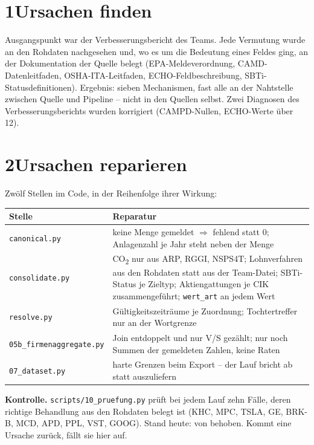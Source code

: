 \documentclass[11pt,a4paper]{article}
\newcommand{\infobox}[1]{\par\noindent\colorbox{softgrey}{\begin{minipage}{\dimexpr\linewidth-2\fboxsep}\small\vspace{3pt}#1\vspace{3pt}\end{minipage}}\par}
\begin{document}
\section*{1\quad Ursachen finden}
Ausgangspunkt war der Verbesserungsbericht des Teams. Jede Vermutung wurde an den Rohdaten nachgesehen und, wo es um die Bedeutung eines Feldes ging, an der Dokumentation der Quelle belegt (EPA-Meldeverordnung, CAMD-Datenleitfaden, OSHA-ITA-Leitfaden, ECHO-Feldbeschreibung, SBTi-Statusdefinitionen). Ergebnis: sieben Mechanismen, fast alle an der Nahtstelle zwischen Quelle und Pipeline -- nicht in den Quellen selbst. Zwei Diagnosen des Verbesserungsberichts wurden korrigiert (CAMPD-Nullen, ECHO-Werte über 12).

\section*{2\quad Ursachen reparieren}
Zwölf Stellen im Code, in der Reihenfolge ihrer Wirkung:

\begin{center}\small
\begin{tabularx}{\textwidth}{P{5.4cm} X}
\toprule
\textbf{Stelle} & \textbf{Reparatur} \\
\midrule
\texttt{canonical.py} & keine Menge gemeldet $\Rightarrow$ fehlend statt 0; Anlagenzahl je Jahr steht neben der Menge \\
\texttt{consolidate.py} & CO\textsubscript{2} nur aus ARP, RGGI, NSPS4T; Lohnverfahren aus den Rohdaten statt aus der Team-Datei; SBTi-Status je Zieltyp; Aktiengattungen je CIK zusammengeführt; \texttt{wert\_art} an jedem Wert \\
\texttt{resolve.py} & Gültigkeitszeiträume je Zuordnung; Tochtertreffer nur an der Wortgrenze \\
\texttt{05b\_firmenaggregate.py} & Join entdoppelt und nur V/S gezählt; nur noch Summen der gemeldeten Zahlen, keine Raten \\
\texttt{07\_dataset.py} & harte Grenzen beim Export -- der Lauf bricht ab statt auszuliefern \\
\bottomrule
\end{tabularx}
\end{center}

\infobox{\textbf{Kontrolle.} \texttt{scripts/10\_pruefung.py} prüft bei jedem Lauf zehn Fälle, deren richtige Behandlung aus den Rohdaten belegt ist (KHC, MPC, TSLA, GE, BRK-B, MCD, APD, PPL, VST, GOOG). Stand heute: \repBehoben{} von \repGesamt{} behoben. Kommt eine Ursache zurück, fällt sie hier auf.}
\end{document}
